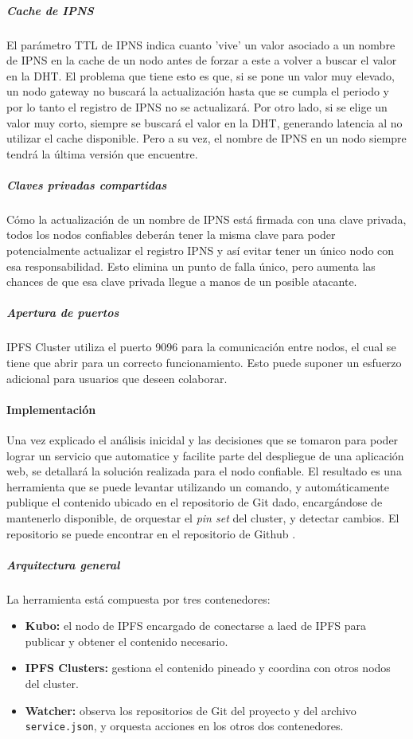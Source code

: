 \subparagraph{Cache de IPNS} El parámetro TTL de IPNS indica cuanto 'vive' un valor asociado a un nombre de IPNS en la cache de un nodo antes de forzar a este a volver a buscar el valor en la DHT. El problema que tiene esto es que, si se pone un valor muy elevado, un nodo gateway no buscará la actualización hasta que se cumpla el periodo y por lo tanto el registro de IPNS no se actualizará. Por otro lado, si se elige un valor muy corto, siempre se buscará el valor en la DHT, generando latencia al no utilizar el cache disponible. Pero a su vez, el nombre de IPNS en un nodo siempre tendrá la última versión que encuentre.

\subparagraph{Claves privadas compartidas} Cómo la actualización de un nombre de IPNS está firmada con una clave privada, todos los nodos confiables deberán tener la misma clave para poder potencialmente actualizar el registro IPNS y así evitar tener un único nodo con esa responsabilidad. Esto elimina un punto de falla único, pero aumenta las chances de que esa clave privada llegue a manos de un posible atacante.

\subparagraph{Apertura de puertos} IPFS Cluster utiliza el puerto 9096 para la comunicación entre nodos, el cual se tiene que abrir para un correcto funcionamiento. Esto puede suponer un esfuerzo adicional para usuarios que deseen colaborar.

\paragraph{Implementación}

Una vez explicado el análisis inicidal y las decisiones que se tomaron para poder lograr un servicio que automatice y facilite parte del despliegue de una aplicación web, se detallará la solución realizada para el nodo confiable. El resultado es una herramienta que se puede levantar utilizando un comando, y automáticamente publique el contenido ubicado en el repositorio de Git dado, encargándose de mantenerlo disponible, de orquestar el \textit{pin set} del cluster, y detectar cambios. El repositorio se puede encontrar en el repositorio de Github \cite{repo-trusted-peer}.

\subparagraph{Arquitectura general}

La herramienta está compuesta por tres contenedores:
\begin{itemize}
    \item \textbf{Kubo:} el nodo de IPFS encargado de conectarse a laed de IPFS para publicar y obtener el contenido necesario.
    \item \textbf{IPFS Clusters:} gestiona el contenido pineado y coordina con otros nodos del cluster.
    \item \textbf{Watcher:} observa los repositorios de Git del proyecto y del archivo \texttt{service.json}, y orquesta acciones en los otros dos contenedores.
\end{itemize}

